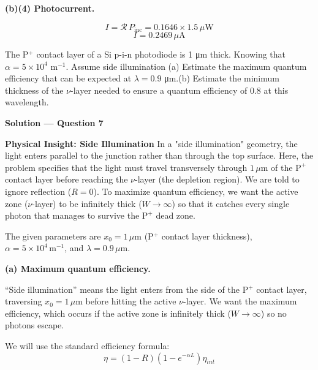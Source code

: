 \textbf{(b)(4) Photocurrent.}

\begin{equation*}
  I = \mathcal{R}\,P_{\text{inc}} = 0.1646 \times 1.5\,\mu\text{W}
\end{equation*}
\begin{equation*}
  \boxed{I = 0.2469\,\mu\text{A}}
\end{equation*}

\begin{question}[Question 7]
The P$^+$ contact layer of a Si p-i-n photodiode is 1 \si{\micro\meter} thick. Knowing that $\alpha = 5\times 10^4$ m$^{-1}$. Assume side illumination (a) Estimate the maximum quantum efficiency that can be expected at $\lambda=0.9$ \si{\micro\meter}.(b) Estimate the minimum thickness of the $\nu$-layer needed to ensure a quantum efficiency of 0.8 at this wavelength.
\end{question}

\textbf{\large Solution --- Question 7}

\textbf{Physical Insight: Side Illumination}
In a "side illumination" geometry, the light enters parallel to the junction rather than through the top surface. Here, the problem specifies that the light must travel transversely through $1\,\mu\text{m}$ of the $\text{P}^+$ contact layer before reaching the $\nu$-layer (the depletion region). We are told to ignore reflection ($R=0$). 
To maximize quantum efficiency, we want the active zone ($\nu$-layer) to be infinitely thick ($W \to \infty$) so that it catches every single photon that manages to survive the $\text{P}^+$ dead zone.

The given parameters are $x_0 = 1\,\mu\text{m}$ (P$^+$ contact layer thickness), $\alpha = 5\times10^4\,\text{m}^{-1}$, and $\lambda = 0.9\,\mu\text{m}$.

\textbf{(a) Maximum quantum efficiency.}

``Side illumination'' means the light enters from the side of the P$^+$ contact layer, traversing $x_0 = 1\,\mu\text{m}$ before hitting the active $\nu$-layer. We want the maximum efficiency, which occurs if the active zone is infinitely thick ($W \to \infty$) so no photons escape.

We will use the standard efficiency formula:
\begin{equation*}
  \eta = (1-R)(1 - e^{-\alpha L})\eta_{int}
\end{equation*}

